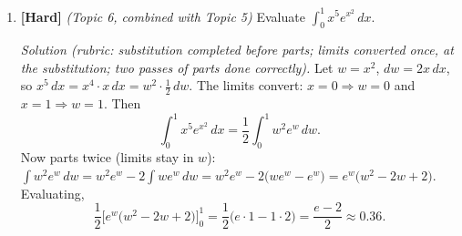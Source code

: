 \documentclass[11pt]{article}
\begin{document}
\begin{enumerate}
\item \textbf{[Hard]} \emph{(Topic 6, combined with Topic 5)} Evaluate $\displaystyle\int_0^1x^5e^{x^2}\,dx$.

\textit{Solution (rubric: substitution completed before parts; limits converted once, at the substitution; two passes of parts done correctly).} Let $w=x^2$, $dw=2x\,dx$, so $x^5\,dx = x^4\cdot x\,dx = w^2\cdot\frac12\,dw$. The limits convert: $x=0\Rightarrow w=0$ and $x=1\Rightarrow w=1$. Then
\[ \int_0^1x^5e^{x^2}\,dx = \frac12\int_0^1w^2e^w\,dw. \]
Now parts twice (limits stay in $w$): $\int w^2e^w\,dw = w^2e^w - 2\int we^w\,dw = w^2e^w - 2\big(we^w-e^w\big) = e^w\big(w^2-2w+2\big)$. Evaluating,
\[ \frac12\Big[e^w\big(w^2-2w+2\big)\Big]_0^1 = \frac12\big(e\cdot1 - 1\cdot2\big) = \frac{e-2}{2}\approx0.36. \]
\end{enumerate}
\end{document}
